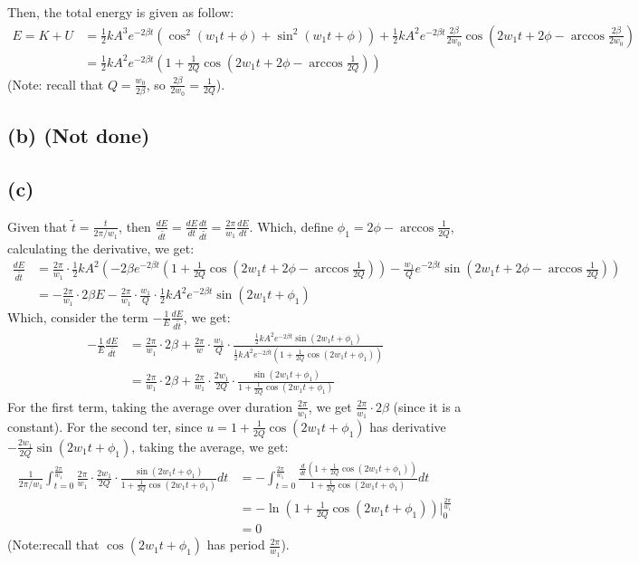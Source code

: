 \documentclass{article}
\begin{document}
Then, the total energy is given as follow:
\begin{align}
    E = K+U &= \frac{1}{2}kA^3e^{-2\beta t}(\cos^2(w_1t+\phi)+\sin^2(w_1t+\phi)) + \frac{1}{2}kA^2e^{-2\beta t}\frac{2\beta}{2w_0}\cos\left(2w_1t+2\phi-\arccos\frac{2\beta}{2w_0}\right)\\
    &= \frac{1}{2}kA^2e^{-2\beta t}\left(1+\frac{1}{2Q}\cos\left(2w_1t+2\phi-\arccos\frac{1}{2Q}\right)\right)
\end{align}
(Note: recall that $Q=\frac{w_0}{2\beta}$, so $\frac{2\beta}{2w_0} = \frac{1}{2Q}$).

\subsection*{(b) (Not done)}

\subsection*{(c)}
Given that $\tilde{t}=\frac{t}{2\pi/w_1}$, then $\frac{dE}{d\tilde{t}} = \frac{dE}{dt}\frac{dt}{d\tilde{t}} = \frac{2\pi}{w_1}\frac{dE}{dt}$. Which, define $\phi_1 = 2\phi-\arccos\frac{1}{2Q}$, calculating the derivative, we get:
\begin{align}
    \frac{dE}{d\tilde{t}} &= \frac{2\pi}{w_1}\cdot \frac{1}{2}kA^2\left(-2\beta e^{-2\beta t}\left(1+\frac{1}{2Q}\cos\left(2w_1t+2\phi-\arccos\frac{1}{2Q}\right)\right) -\frac{w_1}{Q}e^{-2\beta t}\sin\left(2w_1t+2\phi-\arccos\frac{1}{2Q}\right)\right)\\
    &= -\frac{2\pi}{w_1}\cdot 2\beta E-\frac{2\pi}{w_1}\cdot \frac{w_1}{Q}\cdot\frac{1}{2}kA^2e^{-2\beta t}\sin\left(2w_1t+\phi_1\right)
\end{align}
Which, consider the term $-\frac{1}{E}\frac{dE}{d\tilde{t}}$, we get:
\begin{align}
    -\frac{1}{E}\frac{dE}{d\tilde{t}} &= \frac{2\pi}{w_1}\cdot 2\beta +\frac{2\pi}{w}\cdot \frac{w_1}{Q}\cdot\frac{\frac{1}{2}kA^2e^{-2\beta t}\sin(2w_1t+\phi_1)}{\frac{1}{2}kA^2e^{-2\beta t}\left(1+\frac{1}{2Q}\cos\left(2w_1t+\phi_1\right)\right)}\\
    &= \frac{2\pi}{w_1}\cdot 2\beta+\frac{2\pi}{w_1}\cdot\frac{2w_1}{2Q}\cdot\frac{\sin(2w_1t+\phi_1)}{1+\frac{1}{2Q}\cos(2w_1t+\phi_1)}
\end{align}
For the first term, taking the average over duration $\frac{2\pi}{w_1}$, we get $\frac{2\pi}{w_1}\cdot 2\beta$ (since it is a constant). For the second ter, since $u=1+\frac{1}{2Q}\cos(2w_1t+\phi_1)$ has derivative $-\frac{2w_1}{2Q}\sin(2w_1t+\phi_1)$, taking the average, we get:
\begin{align}
    \frac{1}{2\pi/w_1}\int_{t=0}^\frac{2\pi}{w_1}\frac{2\pi}{w_1}\cdot\frac{2w_1}{2Q}\cdot\frac{\sin(2w_1t+\phi_1)}{1+\frac{1}{2Q}\cos(2w_1t+\phi_1)} dt &= -\int_{t=0}^{\frac{2\pi}{w_1}}\frac{\frac{d}{dt}\left(1+\frac{1}{2Q}\cos(2w_1t+\phi_1)\right)}{1+\frac{1}{2Q}\cos(2w_1t+\phi_1)}dt\\
    &= -\ln\left(1+\frac{1}{2Q}\cos(2w_1t+\phi_1)\right)\bigg|_{0}^{\frac{2\pi}{w_1}}\\
    &= 0
\end{align}
(Note:recall that $\cos(2w_1t+\phi_1)$ has period $\frac{2\pi}{w_1}$).
 
\end{document}
